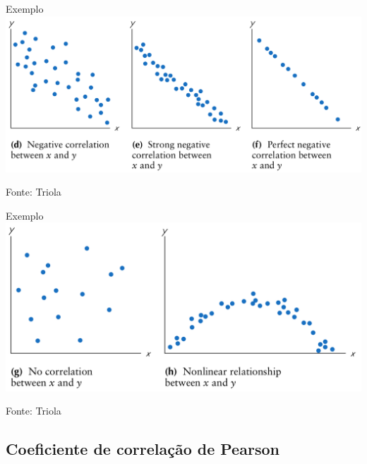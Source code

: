 \documentclass{beamer}
\begin{document}
\begin{frame}{\scriptsize Exemplo}
  \includegraphics[height=0.6\textheight]{Cap17/negative}

  \vfill
  \hfill \tiny Fonte: Triola
\end{frame}

\begin{frame}{\scriptsize Exemplo}
  \includegraphics[height=0.6\textheight]{Cap17/other}

  \vfill
  \hfill \tiny Fonte: Triola
\end{frame}


\subsection[Pearson]{Coeficiente de correlação de Pearson}
\end{document}

